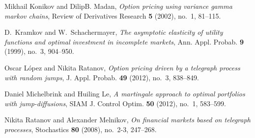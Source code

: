 \documentclass[11pt]{article}
\theoremstyle{plain}
\theoremstyle{definition}
\numberwithin{equation}{section}
\begin{document}
\begin{thebibliography}{10}
Mikhail Konikov and DilipB. Madan, \emph{Option pricing using variance gamma
  markov chains}, Review of Derivatives Research \textbf{5} (2002), no.~1,
  81--115.

D.~Kramkov and W.~Schachermayer, \emph{The asymptotic elasticity of utility
  functions and optimal investment in incomplete markets}, Ann. Appl. Probab.
  \textbf{9} (1999), no.~3, 904--950.

Oscar L{\'o}pez and Nikita Ratanov, \emph{Option pricing driven by a telegraph
  process with random jumps}, J. Appl. Probab. \textbf{49} (2012), no.~3,
  838--849.

Daniel Michelbrink and Huiling Le, \emph{A martingale approach to optimal
  portfolios with jump-diffusions}, SIAM J. Control Optim. \textbf{50} (2012),
  no.~1, 583--599.

Nikita Ratanov and Alexander Melnikov, \emph{On financial markets based on
  telegraph processes}, Stochastics \textbf{80} (2008), no.~2-3, 247--268.

\end{thebibliography}



\end{document}
